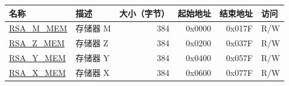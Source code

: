 \label{regdesc:RSAmemory}
\begin{longtable}{ | l | l | r | r | r | l | }

\hline
\rowcolor{lightgray}
\textbf{名称} & \textbf{描述} &  \textbf{大小（字节）} & \textbf{起始地址} & \textbf{结束地址} & \textbf{访问} \\ \hline
\hyperref[regdesc:RSAmemory]{RSA\_M\_MEM} & 存储器 M  & 384   & 0x0000 & 0x017F & R/W \\ \hline
\hyperref[regdesc:RSAmemory]{RSA\_Z\_MEM} & 存储器 Z  & 384  & 0x0200 & 0x037F & R/W \\ \hline
\hyperref[regdesc:RSAmemory]{RSA\_Y\_MEM} & 存储器 Y  & 384  & 0x0400 & 0x057F & R/W \\ \hline
\hyperref[regdesc:RSAmemory]{RSA\_X\_MEM} & 存储器 X  & 384  & 0x0600 & 0x077F & R/W \\ \hline

\end{longtable}
